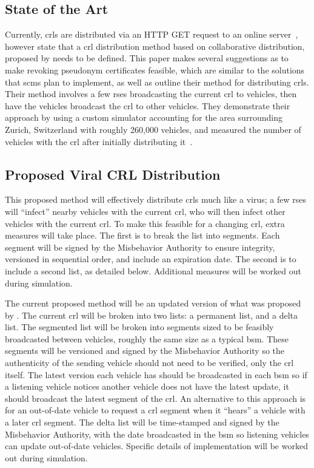 \documentclass {article}
\begin{document}
\subsection{State of the Art}
Currently, \gls{crl}s are distributed via an HTTP GET request to an online server~\autocite{brecht_scms_nodate}, however \autocite{brecht_security_2018} state that a \gls{crl} distribution method based on collaborative distribution, proposed by \autocite{haas_efficient_2011} needs to be defined. This paper makes several suggestions as to make revoking pseudonym certificates feasible, which are similar to the solutions that \gls{scms} plan to implement, as well as outline their method for distributing \gls{crl}s. Their method involves a few \gls{rse}s broadcasting the current \gls{crl} to vehicles, then have the vehicles broadcast the \gls{crl} to other vehicles. They demonstrate their approach by using a custom simulator accounting for the area surrounding Zurich, Switzerland with roughly 260,000 vehicles, and measured the number of vehicles with the \gls{crl} after initially distributing it~\autocite{haas_efficient_2011}.

\subsection{Proposed Viral CRL Distribution}
This proposed method will effectively distribute \gls{crl}s much like a virus; a few \gls{rse}s will ``infect'' nearby vehicles with the current \gls{crl}, who will then infect other vehicles with the current \gls{crl}. To make this feasible for a changing \gls{crl}, extra measures will take place. The first is to break the list into segments. Each segment will be signed by the Misbehavior Authority to ensure integrity, versioned in sequential order, and include an expiration date. The second is to include a second list, as detailed below. Additional measures will be worked out during simulation.

The current proposed method will be an updated version of what was proposed by \autocite{haas_efficient_2011}. The current \gls{crl} will be broken into two lists: a permanent list, and a delta list. The segmented list will be broken into segments sized to be feasibly broadcasted between vehicles, roughly the same size as a typical \gls{bsm}. These segments will be versioned and signed by the Misbehavior Authority so the authenticity of the sending vehicle should not need to be verified, only the \gls{crl} itself. The latest version each vehicle has should be broadcasted in each \gls{bsm} so if a listening vehicle notices another vehicle does not have the latest update, it should broadcast the latest segment of the \gls{crl}. An alternative to this approach is for an out-of-date vehicle to request a \gls{crl} segment when it ``hears'' a vehicle with a later \gls{crl} segment. The delta list will be time-stamped and signed by the Misbehavior Authority, with the date broadcasted in the \gls{bsm} so listening vehicles can update out-of-date vehicles. Specific details of implementation will be worked out during simulation.
\end{document}
